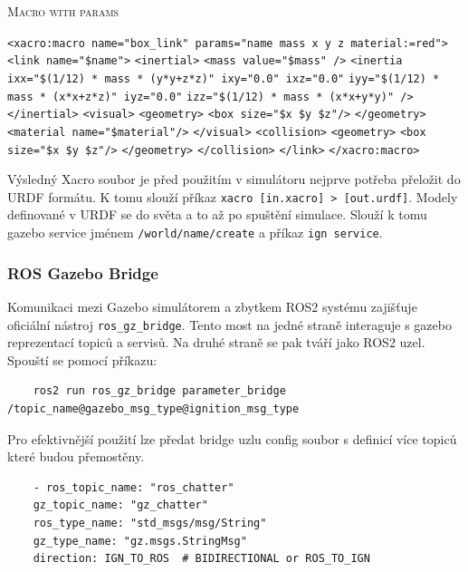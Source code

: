 \begin{algorithm}[h!]
	\label{}
	\caption{\textsc{Macro with params}}
	
	\DontPrintSemicolon
	\SetAlgoNoLine
	\SetNlSty{}{}{:}
	\SetNlSkip{-1.1em}
	
	\BlankLine \Indp\Indpp
	
	\texttt{<xacro:macro name="box\_link" params="name mass x y z material:=red">}\;
	\Indp\Indp
	\texttt{<link name="\${name}">}\;
	\Indp\Indp
	\texttt{<inertial>}\;
	\Indp\Indp
	\texttt{<mass value="\${mass}" />}\;
	\texttt{<inertia ixx="\${(1/12) * mass * (y*y+z*z)}" ixy="0.0" ixz="0.0"}\;
	\Indp\Indp
	\texttt{iyy="\${(1/12) * mass * (x*x+z*z)}" iyz="0.0"}\;
	\texttt{izz="\${(1/12) * mass * (x*x+y*y)}" />}\;
	\Indm\Indm
	\Indm\Indm
	\texttt{</inertial>}\;
	\texttt{<visual>}\;
	\Indp\Indp
	\texttt{<geometry>}\;	
	\Indp\Indp
	\texttt{<box size="\${x} \${y} \${z}"/>}\;
	\Indm\Indm
	\texttt{</geometry>}\;
	\texttt{<material name="\${material}"/>}\;
	\Indm\Indm
	\texttt{</visual>}\;
	\texttt{<collision>}\;
	\Indp\Indp
	\texttt{<geometry>}\;
	\Indp\Indp
	\texttt{<box size="\${x} \${y} \${z}"/>}\;
	\Indm\Indm
	\texttt{</geometry>}\;
	\Indm\Indm
	\texttt{</collision>}\;
	\Indm\Indm
	\texttt{</link>}\;
	\Indm\Indm
	\texttt{</xacro:macro>}\;
	
\end{algorithm}

Výsledný Xacro soubor je před použitím v simulátoru nejprve potřeba přeložit do URDF formátu. K tomu slouží příkaz \verb|xacro [in.xacro] > [out.urdf]|. Modely definované v URDF se do světa  a to až po spuštění simulace. Slouží k tomu gazebo service jménem \verb|/world/name/create| a příkaz \verb|ign service|. 

\subsubsection*{ROS Gazebo Bridge}
Komunikaci mezi Gazebo simulátorem a zbytkem ROS2 systému zajišťuje oficiální nástroj \verb|ros_gz_bridge|. Tento most na jedné straně interaguje s gazebo reprezentací topiců a servisů. Na druhé straně se pak tváří jako ROS2 uzel. Spouští se pomocí příkazu:
\begin{verbatim}
	ros2 run ros_gz_bridge parameter_bridge /topic_name@gazebo_msg_type@ignition_msg_type
\end{verbatim}
Pro efektivnější použití lze předat bridge uzlu config soubor s definicí více topiců které budou přemostěny.
\begin{verbatim}
	- ros_topic_name: "ros_chatter"
	gz_topic_name: "gz_chatter"
	ros_type_name: "std_msgs/msg/String"
	gz_type_name: "gz.msgs.StringMsg"
	direction: IGN_TO_ROS  # BIDIRECTIONAL or ROS_TO_IGN
\end{verbatim}

